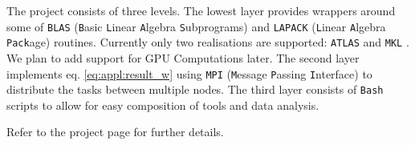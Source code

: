 \documentclass[a4paper,12pt]{article}
\begin{document}
    The project consists of three levels. The lowest layer provides wrappers around some of \texttt{BLAS} (\texttt{B}asic \texttt{L}inear \texttt{A}lgebra \texttt{S}ubprograms) and \texttt{LAPACK} (\texttt{L}inear \texttt{A}lgebra \texttt{Pack}age) routines. Currently only two realisations are supported: \texttt{ATLAS} \cite{atlas_siam} and \texttt{MKL} \cite{intel-mkl}. We plan to add support for GPU Computations later. The second layer implements eq. \eqref{eq:appl:result_w} using \texttt{MPI} (\texttt{M}essage \texttt{P}assing \texttt{I}nterface) to distribute the tasks between multiple nodes. The third layer consists of \texttt{Bash} scripts to allow for easy composition of tools and data analysis.

    Refer to the project page for further details.
 


\newpage


\end{document}
